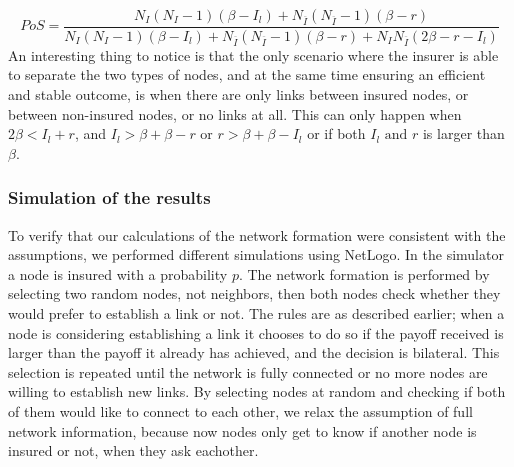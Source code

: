 \begin{equation}
PoS=\frac{N_{I}(N_{I}-1)(\beta-I_{l})+N_{\overline{I}}(N_{\overline{I}}-1)(\beta-r)}{N_{I}(N_{I}-1)(\beta-I_{l})+N_{\overline{I}}(N_{\overline{I}}-1)(\beta-r)+N_{I}N_{\overline{I}}(2\beta-r-I_{l})}
\label{eq:model2-pos}
\end{equation}
An interesting thing to notice is that the only scenario where the insurer is able to separate the two types of nodes, and at the same time ensuring an efficient and stable outcome, is when there are only links between insured nodes, or between non-insured nodes, or no links at all.
This can only happen when $2\beta<I_{l}+r$, and $I_{l}>\beta+\beta-r$ or $r>\beta+\beta-I_{l}$ or if both $I_{l} \text{ and }r$ is larger than $\beta$.

\subsubsection{Simulation of the results}
To verify that our calculations of the network formation were consistent with the assumptions, we performed different simulations using NetLogo. In the simulator a node is insured with a probability $p$. The network formation is performed by selecting two random nodes, not neighbors, then both nodes check whether they would prefer to establish a link or not. 
The rules are as described earlier; when a node is considering establishing a link it chooses to do so if the payoff received is larger than the payoff it already has achieved, and the decision is bilateral.
This selection is repeated until the network is fully connected or no more nodes are willing to establish new links.
By selecting nodes at random and checking if both of them would like to connect to each other, we relax the assumption of full network information, because now nodes only get to know if another node is insured or not, when they ask eachother.

